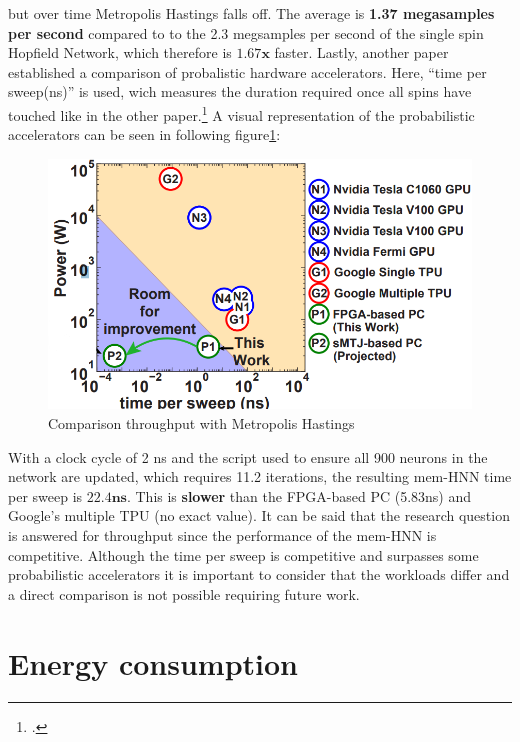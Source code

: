 but over time Metropolis Hastings falls off. The average is \textbf{1.37 megasamples per second} compared to to the 2.3
megsamples per second of the single spin Hopfield Network, which therefore is \(\mathbf{1.67x}\) faster.
Lastly, another paper established a comparison of probalistic hardware accelerators. Here, ``time per sweep(ns)'' is used, wich measures the duration required
once all spins have touched like in the other paper.\footcite[cf.][2]{aaditAcceleratingAdaptiveParallel2023}
A visual representation of the probabilistic accelerators can be seen in following figure\ref{Comparison_throughput_literature_2}:
\begin{figure}[H]
    \centering
    \includegraphics[width=0.50\linewidth]{graphics/Troughput_comparison.png}
    \caption{Comparison throughput with Metropolis Hastings}
    \label{Comparison_throughput_literature_2}
\end{figure}
With a clock cycle of 2 ns and the script used to ensure all 900 neurons in the network are updated, which requires 11.2 iterations, the resulting \ac{mem-HNN} time per sweep is \(\mathbf{22.4ns}\).
This is \textbf{slower} than the \ac{FPGA}-based PC (5.83ns) and Google’s multiple TPU (no exact value). 
It can be said that the research question is answered for throughput since the performance of the \ac{mem-HNN} is competitive. 
Although the time per sweep is competitive and surpasses some probabilistic accelerators it is important to consider that the workloads differ and a direct comparison is not possible requiring future work.
\section{Energy consumption}

